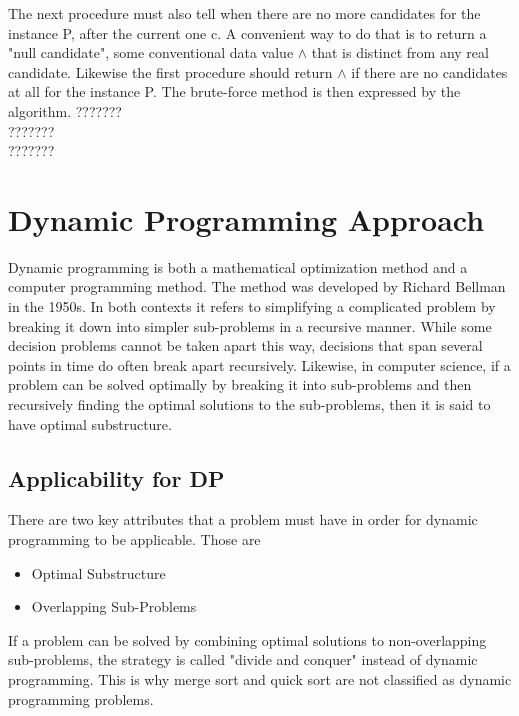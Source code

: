 \documentclass{report}
\begin{document}
    The next procedure must also tell when there are no more candidates for the instance P, after the current one c. A convenient way to do that is to return a "null candidate", some conventional data value $\land$ that is distinct from any real candidate. Likewise the first procedure should return $\land$ if there are no candidates at all for the instance P. The brute-force method is then expressed by the algorithm.
    ???????\\
    ???????\\
    ???????
    
    \newpage
    \section{Dynamic Programming Approach}
    \bigskip
    Dynamic programming is both a mathematical optimization method and a computer programming method. The method was developed by Richard Bellman in the 1950s.
    In both contexts it refers to simplifying a complicated problem by breaking it down into simpler sub-problems in a recursive manner. While some decision problems cannot be taken apart this way, decisions that span several points in time do often break apart recursively. Likewise, in computer science, if a problem can be solved optimally by breaking it into sub-problems and then recursively finding the optimal solutions to the sub-problems, then it is said to have optimal substructure.
    \bigskip
    \subsection{Applicability for DP}
    There are two key attributes that a problem must have in order for dynamic programming to be applicable. Those are 
    \begin{itemize}
        \item {Optimal Substructure} 
        \item {Overlapping Sub-Problems}
    \end{itemize}
    If a problem can be solved by combining optimal solutions to non-overlapping sub-problems, the strategy is called "divide and conquer" instead of dynamic programming. This is why merge sort and quick sort are not classified as dynamic programming problems.
    
\end{document}
